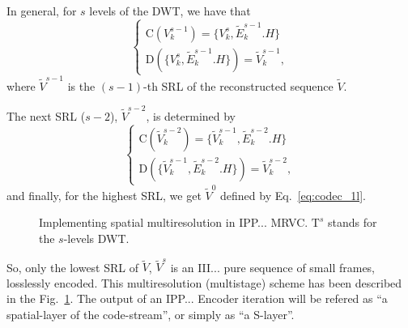 In general, for $s$ levels of the DWT, we have that
\begin{equation}
  \left\{
    \begin{array}{l}
      \text{C}(V^{s-1}_k) = \{V^s_k, \tilde{E}^{s-1}_k.H\} \\
      \text{D}(\{V^s_k, \tilde{E}^{s-1}_k.H\}) = \tilde{V}^{s-1}_k,
    \end{array}
  \right.
  \label{eq:codec_sl}
\end{equation}
where $\tilde{V}^{s-1}$ is the $(s-1)$-th SRL of the reconstructed
sequence $\tilde{V}$.

The next SRL ($s-2$), $\tilde{V}^{s-2}$, is determined by
\begin{equation}
  \left\{
    \begin{array}{l}
      \text{C}(\tilde{V}^{s-2}_k) = \{\tilde{V}^{s-1}_k, \tilde{E}^{s-2}_k.H\} \\
      \text{D}(\{\tilde{V}^{s-1}_k, \tilde{E}^{s-2}_k.H\}) = \tilde{V}^{s-2}_k,
    \end{array}
  \right.
  \label{eq:codec_s1l}
\end{equation}
and finally, for the highest SRL, we get $\tilde{V}^0$ defined by
Eq.~\ref{eq:codec_1l}.

\begin{figure}
  \centering
  \caption{Implementing spatial multiresolution in
    IPP... MRVC. $\text{T}^s$ stands for the $s$-levels DWT.}
  \label{fig:multiresolution}
\end{figure}

So, only the lowest SRL of $\tilde{V}$, $\tilde{V}^s$ is an
III... pure sequence of small frames, losslessly encoded. This
multiresolution (multistage) scheme has been described in the
Fig.~\ref{fig:multiresolution}. The output of an IPP... Encoder
iteration will be refered as ``a spatial-layer of the code-stream'',
or simply as ``a S-layer''.

